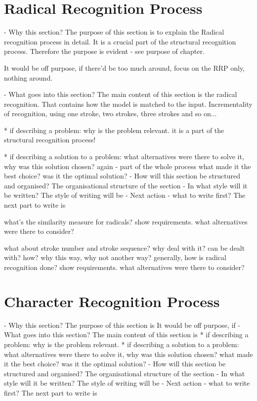 \section{Radical Recognition Process}
\label{sec:hwre:radicalrecognitionprocess}

- Why this section? 
  The purpose of this section is to explain the Radical recognition process in
  detail. It is a crucial part of the structural recognition process.
  Therefore the purpose is evident - see purpose of chapter.

  It would be off purpose, if there'd be too much around,
  focus on the RRP only, nothing around.

- What goes into this section?
  The main content of this section is the radical recognition.
  That contains how the model is matched to the input.
  Incrementality of recognition, using one stroke, two strokes,
  three strokes and so on...

  * if describing a problem: why is the problem relevant.
    it is a part of the structural recognition process!

  * if describing a solution to a problem: what alternatives were
    there to solve it, why was this solution chosen? 
    again - part of the whole process
    what made it the best choice? was it the optimal solution?
- How will this section be structured and organised?
  The organisational structure of the section 
- In what style will it be written?
  The style of writing will be 
- Next action - what to write first?
  The next part to write is


what's the similarity measure for
radicals?
show requirements.
what alternatives were there to consider?

what about stroke number and stroke sequence?
why deal with it? can be dealt with? 
how? why this way, why not another way?
generally, how is radical recognition done?
show requirements.
what alternatives were there to consider?

\section{Character Recognition Process}
\label{sec:hwre:characterrecognitionprocess}

- Why this section? 
  The purpose of this section is 
  It would be off purpose, if 
- What goes into this section?
  The main content of this section is 
  * if describing a problem: why is the problem relevant.
  * if describing a solution to a problem: what alternatives were
    there to solve it, why was this solution chosen? 
    what made it the best choice? was it the optimal solution?
- How will this section be structured and organised?
  The organisational structure of the section 
- In what style will it be written?
  The style of writing will be 
- Next action - what to write first?
  The next part to write is


